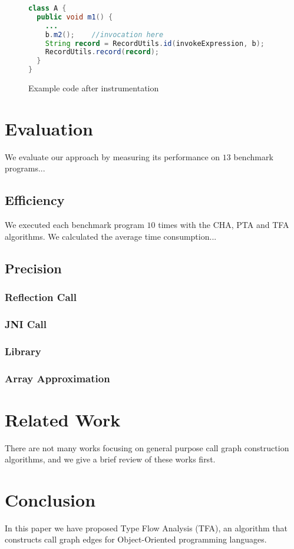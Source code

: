 \documentclass{fac}
\begin{document}
\begin{figure}
\begin{lstlisting}[language={java},frame={single}]
class A {
  public void m1() {
    ...
    b.m2();    //invocation here
    String record = RecordUtils.id(invokeExpression, b);
    RecordUtils.record(record);
  }
}
\end{lstlisting}
\caption{Example code after instrumentation}
\label{fig:after-instru}
\end{figure}



\section{Evaluation}\label{sec:evaluation}
We evaluate our approach by measuring its performance on $13$ benchmark programs...
\subsection{Efficiency}\label{subsec:efficiency}
We executed each benchmark program $10$ times with the CHA, PTA and TFA algorithms. We calculated the average time consumption...
\subsection{Precision}\label{subsec:precision}
\subsubsection{Reflection Call}\label{subsubsec:reflection-call}
\subsubsection{JNI Call}\label{subsubsec:jni-call}
\subsubsection{Library}\label{subsubsec:library}
\subsubsection{Array Approximation}\label{subsubsec:array-approximation}

\section{Related Work}\label{sec:related-work}
There are not many works focusing on general purpose call graph construction algorithms, and we give a brief review of these works first.

\section{Conclusion}\label{sec:conclusion}
In this paper we have proposed Type Flow Analysis (TFA), an algorithm that constructs call graph edges for Object-Oriented programming languages.

\label{lastpage}
\end{document}
